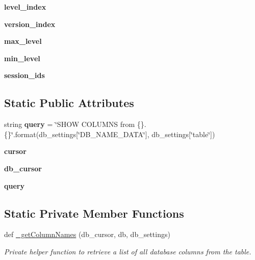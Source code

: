 \begin{DoxyCompactItemize}
{\bfseries level\+\_\+index}
\item 
\mbox{\label{class_game_table_1_1_game_table_a7893a1ff1ed2c2128dd47c01da41086c}} 
{\bfseries version\+\_\+index}
\item 
\mbox{\label{class_game_table_1_1_game_table_a914077ba90cddbfbd8b13bea56f4008d}} 
{\bfseries max\+\_\+level}
\item 
\mbox{\label{class_game_table_1_1_game_table_a6a6a4fef11dfbb2111b1bd2568380774}} 
{\bfseries min\+\_\+level}
\item 
\mbox{\label{class_game_table_1_1_game_table_a8bf2a912ab31a23d98857741027b1657}} 
{\bfseries session\+\_\+ids}
\end{DoxyCompactItemize}
\subsection*{Static Public Attributes}
\begin{DoxyCompactItemize}
\item 
\mbox{\label{class_game_table_1_1_game_table_a095999b1c52a72cbb04109151d664e20}} 
string {\bfseries query} = \char`\"{}S\+H\+OW C\+O\+L\+U\+M\+NS from \{\}.\{\}\char`\"{}.format(db\+\_\+settings\mbox{[}\char`\"{}D\+B\+\_\+\+N\+A\+M\+E\+\_\+\+D\+A\+TA\char`\"{}\mbox{]}, db\+\_\+settings\mbox{[}\char`\"{}table\char`\"{}\mbox{]})
\item 
\mbox{\label{class_game_table_1_1_game_table_a1df63d3fca77aca00ffb15f2e7560fba}} 
{\bfseries cursor}
\item 
\mbox{\label{class_game_table_1_1_game_table_a112f8dd82056e71caa9607557d9363ec}} 
{\bfseries db\+\_\+cursor}
\item 
\mbox{\label{class_game_table_1_1_game_table_a2c11c519852db4faefb4d1a76f051d89}} 
{\bfseries query}
\end{DoxyCompactItemize}
\subsection*{Static Private Member Functions}
\begin{DoxyCompactItemize}
\item 
def \mbox{\hyperlink{class_game_table_1_1_game_table_a53de09318575062d54e7fbac6ced6e72}{\+\_\+get\+Column\+Names}} (db\+\_\+cursor, db, db\+\_\+settings)
\begin{DoxyCompactList}\small\item\em Private helper function to retrieve a list of all database columns from the table. \end{DoxyCompactList}\end{DoxyCompactItemize}


